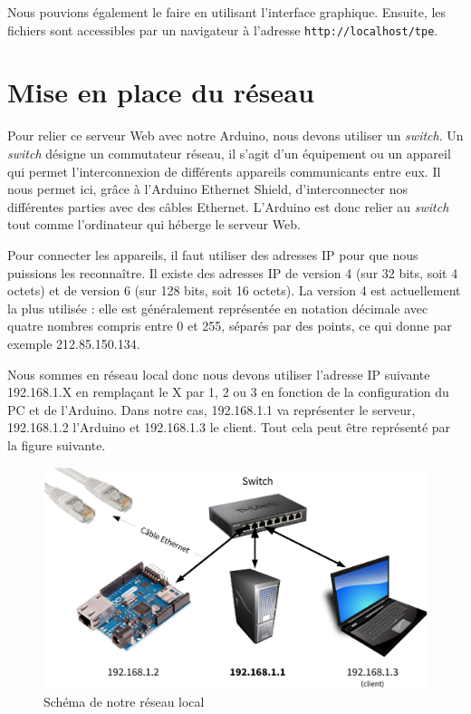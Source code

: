 
Nous pouvions également le faire en utilisant l'interface graphique. Ensuite, les fichiers sont accessibles par un navigateur à l'adresse \verb-http://localhost/tpe-.

\section{Mise en place du réseau}

Pour relier ce serveur Web avec notre Arduino, nous devons utiliser un \emph{switch}. Un \emph{switch} désigne un commutateur réseau, il s'agit d'un équipement ou un appareil qui permet l'interconnexion de différents appareils communicants entre eux. Il nous permet ici, grâce à l'Arduino Ethernet Shield, d'interconnecter nos différentes parties avec des câbles Ethernet. L'Arduino est donc relier au \emph{switch} tout comme l'ordinateur qui héberge le serveur Web.

Pour connecter les appareils, il faut utiliser des adresses IP pour que nous puissions les reconnaître. Il existe des adresses IP de version 4 (sur 32 bits, soit 4 octets) et de version 6 (sur 128 bits, soit 16 octets). La version 4 est actuellement la plus utilisée : elle est généralement représentée en notation décimale avec quatre nombres compris entre 0 et 255, séparés par des points, ce qui donne par exemple 212.85.150.134.

Nous sommes en réseau local donc nous devons utiliser l'adresse IP suivante 192.168.1.X en remplaçant le X par 1, 2 ou 3 en fonction de la configuration du PC et de l'Arduino. Dans notre cas, 192.168.1.1 va représenter le serveur, 192.168.1.2 l'Arduino et 192.168.1.3 le client. Tout cela peut être représenté par la figure suivante.

\begin{figure}[!h]
	\centering
	\includegraphics[width=.8\linewidth]{Images/Schema_reseau}
	\caption{Schéma de notre réseau local}
\end{figure}

